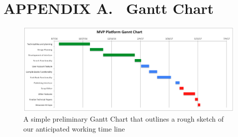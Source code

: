 \documentclass[letterpaper, 10pt, draftclsnofoot, compsoc, onecolumn]{IEEEtran}
\begin{document}
{{


\clearpage
\section[APPENDIX A. \ Gantt Chart]{\rmfamily\bfseries\color{black}
APPENDIX A. \ Gantt Chart}

\bigskip


\begin{figure}[ht!]
\centering
\includegraphics[width=160mm]{gantt_chart.png}
\caption{A simple preliminary Gantt Chart that outlines a rough sketch of our anticipated working time line}
\end{figure}

}}
\end{document}
